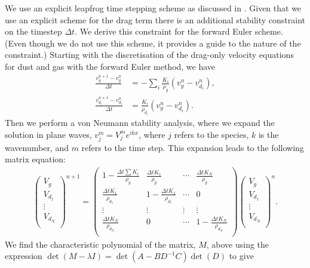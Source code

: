 \documentclass[fleqn,usenatbib]{mnras}
\begin{document}
We use an explicit leapfrog time stepping scheme as discussed in
\citet{Price2018PASA...35...31P}. Given that we use an explicit scheme for the
drag term there is an additional stability constraint on the timestep \(\Delta
t\). We derive this constraint for the forward Euler scheme. (Even though we do
not use this scheme, it provides a guide to the nature of the constraint.)
Starting with the discretisation of the drag-only velocity equations for dust
and gas with the forward Euler method, we have
%
\begin{align}
   \frac{v_g^{n+1} - v_g^n}{\Delta t} &= - \sum_i \frac{K_i}{\rho_g} \left(v_g^n - v_{d_i}^n\right), \\
   \frac{v_{d_i}^{n+1} - v_{d_i}^n}{\Delta t} &= \frac{K_i}{\rho_{d_i}} \left(v_g^n - v_{d_i}^n\right).
\end{align}
%
Then we perform a von Neumann stability analysis, where we expand the solution
in plane waves, \(v_j^m = V_j^m e^{i k x}\), where \(j\) refers to the species,
\(k\) is the wavenumber, and \(m\) refers to the time step. This expansion leads
to the following matrix equation:
%
\begin{align}
   \begin{pmatrix}
      V_g \\ V_{d_1} \\ \vdots \\ V_{d_N} \\
   \end{pmatrix}^{n+1} =
   \begin{pmatrix}
      1 - \frac{\Delta t \sum K_i}{\rho_g} & \frac{\Delta t K_1}{\rho_g} & \cdots & \frac{\Delta t K_N}{\rho_g} \\
      \frac{\Delta t K_1}{\rho_{d_1}} & 1 - \frac{\Delta t K_1}{\rho_{d_1}} & \cdots & 0 \\
      \vdots & \vdots & \vdots & \vdots \\
      \frac{\Delta t K_N}{\rho_{d_N}} & 0 & \cdots & 1 - \frac{\Delta t K_N}{\rho_{d_N}} \\
   \end{pmatrix}
   \begin{pmatrix}
      V_g \\ V_{d_1} \\ \vdots \\ V_{d_N} \\
   \end{pmatrix}^{n}.
\end{align}
%
We find the characteristic polynomial of the matrix, \(M\), above using the
expression \(\det(M - \lambda I) = \det(A - B D^{-1} C) \det(D)\) to give
\end{document}
